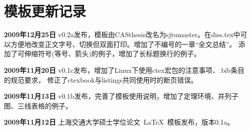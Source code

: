 \chapter{模板更新记录}
\label{chap:updatelog}

\textbf{2009年12月25日} v0.2a发布，模板由CASthesis改名为sjtumaster。在diss.tex中可以方便地改变正文字号、切换但双面打印。增加了不编号的一章“全文总结”。
添加了可伸缩符号(等号、箭头)的例子，增加了长标题换行的例子。

\textbf{2009年11月20日} v0.1c发布，增加了Linux下使用ctex宏包的注意事项、.bib条目的规范要求，
修正了ctexbook与listings共同使用时的断页错误。

\textbf{2009年11月13日} v0.1b发布，完善了模板使用说明，增加了定理环境、并列子图、三线表格的例子。

\textbf{2009年11月12日} 上海交通大学硕士学位论文~\LaTeX~模板发布，版本0.1a。

